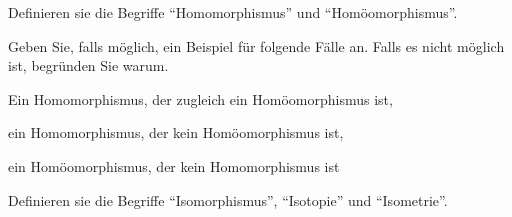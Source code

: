 \begin{aufgabe}[Begriffe]\label{ub3:meinsExtra}
    Definieren sie die Begriffe \enquote{Homomorphismus} und
    \enquote{Homöomorphismus}.

    Geben Sie, falls möglich, ein Beispiel für folgende Fälle an.
    Falls es nicht möglich ist, begründen Sie warum.
    \begin{bspenum}
        \item Ein Homomorphismus, der zugleich ein Homöomorphismus ist,
        \item ein Homomorphismus, der kein Homöomorphismus ist,
        \item ein Homöomorphismus, der kein Homomorphismus ist
    \end{bspenum}
\end{aufgabe}

\begin{aufgabe}[Begriffe]\label{ub3:meinsExtra2}
    Definieren sie die Begriffe \enquote{Isomorphismus},
    \enquote{Isotopie} und \enquote{Isometrie}.
\end{aufgabe}
